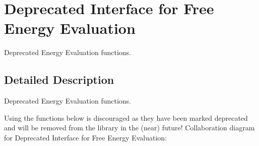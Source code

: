 \hypertarget{group__eval__deprecated}{}\section{Deprecated Interface for Free Energy Evaluation}
\label{group__eval__deprecated}


Deprecated Energy Evaluation functions.  




\subsection{Detailed Description}
Deprecated Energy Evaluation functions. 

Using the functions below is discouraged as they have been marked deprecated and will be removed from the library in the (near) future! Collaboration diagram for Deprecated Interface for Free Energy Evaluation\+:
